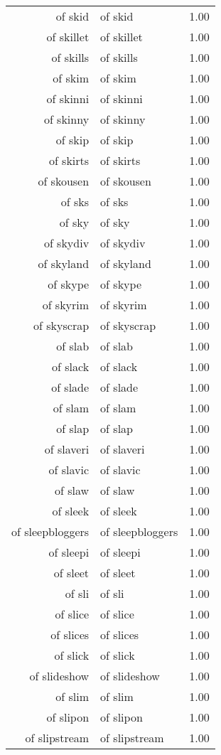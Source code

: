\begin{table}[ht]
\begin{tabular}{rlr}
  of skid & of skid & 1.00 \\ 
  of skillet & of skillet & 1.00 \\ 
  of skills & of skills & 1.00 \\ 
  of skim & of skim & 1.00 \\ 
  of skinni & of skinni & 1.00 \\ 
  of skinny & of skinny & 1.00 \\ 
  of skip & of skip & 1.00 \\ 
  of skirts & of skirts & 1.00 \\ 
  of skousen & of skousen & 1.00 \\ 
  of sks & of sks & 1.00 \\ 
  of sky & of sky & 1.00 \\ 
  of skydiv & of skydiv & 1.00 \\ 
  of skyland & of skyland & 1.00 \\ 
  of skype & of skype & 1.00 \\ 
  of skyrim & of skyrim & 1.00 \\ 
  of skyscrap & of skyscrap & 1.00 \\ 
  of slab & of slab & 1.00 \\ 
  of slack & of slack & 1.00 \\ 
  of slade & of slade & 1.00 \\ 
  of slam & of slam & 1.00 \\ 
  of slap & of slap & 1.00 \\ 
  of slaveri & of slaveri & 1.00 \\ 
  of slavic & of slavic & 1.00 \\ 
  of slaw & of slaw & 1.00 \\ 
  of sleek & of sleek & 1.00 \\ 
  of sleepbloggers & of sleepbloggers & 1.00 \\ 
  of sleepi & of sleepi & 1.00 \\ 
  of sleet & of sleet & 1.00 \\ 
  of sli & of sli & 1.00 \\ 
  of slice & of slice & 1.00 \\ 
  of slices & of slices & 1.00 \\ 
  of slick & of slick & 1.00 \\ 
  of slideshow & of slideshow & 1.00 \\ 
  of slim & of slim & 1.00 \\ 
  of slipon & of slipon & 1.00 \\ 
  of slipstream & of slipstream & 1.00 \\ 

\end{tabular}
\end{table}
